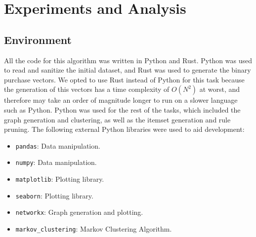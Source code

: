 \chapter{Experiments and Analysis}

\section{Environment}
All the code for this algorithm was written in Python and Rust. Python was used to read and sanitize the initial dataset, and Rust was used to generate the binary purchase vectors. We opted to use Rust instead of Python for this task because the generation of this vectors has a time complexity of $O(N^2)$ at worst, and therefore may take an order of magnitude longer to run on a slower language such as Python. Python was used for the rest of the tasks, which included the graph generation and clustering, as well as the itemset generation and rule pruning. The following external Python libraries were used to aid development:
\begin{itemize}
\item \texttt{pandas}: Data manipulation.
\item \texttt{numpy}: Data manipulation.
\item \texttt{matplotlib}: Plotting library.
\item \texttt{seaborn}: Plotting library.
\item \texttt{networkx}: Graph generation and plotting.
\item \texttt{markov\_clustering}: Markov Clustering Algorithm.
\end{itemize}

